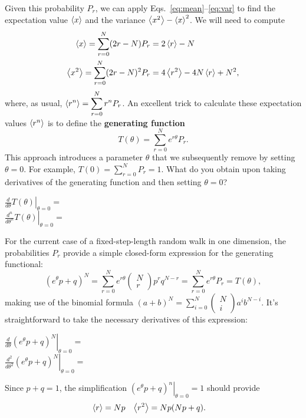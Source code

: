 Given this probability $P_r$, we can apply Eqs.~\ref{eq:mean}--\ref{eq:var} to find the expectation value $\left\langle x \right\rangle$ and the variance $\left\langle x^2 \right\rangle - \left\langle x \right\rangle^2$.
We will need to compute
\begin{align*}
  \left\langle x \right\rangle   = \sum_{r = 0}^N (2r - N)   P_r & = 2\left\langle r \right\rangle - N \\
  \left\langle x^2 \right\rangle = \sum_{r = 0}^N (2r - N)^2 P_r & = 4\left\langle r^2 \right\rangle - 4N\left\langle r \right\rangle + N^2,
\end{align*}
where, as usual, $\displaystyle \left\langle r^n \right\rangle = \sum_{r = 0}^N r^n P_r$.
An excellent trick to calculate these expectation values $\left\langle r^n \right\rangle$ is to define the \textbf{generating function}
\begin{equation}
  T(\theta) = \sum_{r = 0}^N e^{r \theta} P_r.
\end{equation}
\newpage %
\noindent This approach introduces a parameter $\theta$ that we subsequently remove by setting $\theta = 0$.
For example, $T(0) = \sum_{r = 0}^N P_r = 1$.
What do you obtain upon taking derivatives of the generating function and then setting $\theta = 0$?
\begin{mdframed}
  $\displaystyle \left.\frac{d}{d\theta} T(\theta)\right|_{\theta = 0} = $ \\[50 pt]
  $\displaystyle \left.\frac{d^n}{d\theta^n} T(\theta)\right|_{\theta = 0} = $ \\[50 pt]
\end{mdframed}

For the current case of a fixed-step-length random walk in one dimension, the probabilities $P_r$ provide a simple closed-form expression for the generating functional:
\begin{equation*}
  \left(e^{\theta} p + q\right)^N = \sum_{r = 0}^N e^{r \theta} \left(\begin{array}{c}N \\ r\end{array}\right) p^r q^{N - r} = \sum_{r = 0}^N e^{r \theta} P_r = T(\theta),
\end{equation*}
making use of the binomial formula $\left(a + b\right)^N = \sum_{i = 0}^N \left(\begin{array}{c}N \\ i\end{array}\right) a^i b^{N - i}$.
It's straightforward to take the necessary derivatives of this expression:
\begin{mdframed}
  $\displaystyle \left.\frac{d}{d\theta} \left(e^{\theta} p + q\right)^N \right|_{\theta = 0} = $ \\[50 pt]
  $\displaystyle \left.\frac{d^2}{d\theta^2} \left(e^{\theta} p + q\right)^N \right|_{\theta = 0} = $ \\[50 pt]
\end{mdframed}
Since $p + q = 1$, the simplification $\left.\left(e^{\theta} p + q\right)^n \right|_{\theta = 0} = 1$ should provide
\begin{align*}
  \left\langle r \right\rangle   & = Np &
  \left\langle r^2 \right\rangle & = Np(Np + q).
\end{align*}


